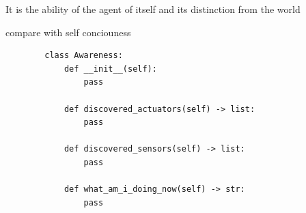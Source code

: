 \documentclass[a4paper]{article}
\begin{document}
    
    It is the ability of the agent of itself and its distinction from the world
    
    compare with self conciouness
    \begin{verbatim}
        class Awareness:
            def __init__(self):
                pass
            
            def discovered_actuators(self) -> list:
                pass
            
            def discovered_sensors(self) -> list:
                pass
            
            def what_am_i_doing_now(self) -> str:
                pass
    \end{verbatim}
    
    
    
    
\end{document}
